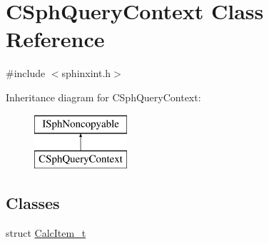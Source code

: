 \hypertarget{classCSphQueryContext}{\section{C\-Sph\-Query\-Context Class Reference}
\label{classCSphQueryContext}
}


{\ttfamily \#include $<$sphinxint.\-h$>$}

Inheritance diagram for C\-Sph\-Query\-Context\-:\begin{figure}[H]
\begin{center}
\leavevmode
\includegraphics[height=2.000000cm]{classCSphQueryContext}
\end{center}
\end{figure}
\subsection*{Classes}
\begin{DoxyCompactItemize}
\item 
struct \hyperlink{structCSphQueryContext_1_1CalcItem__t}{Calc\-Item\-\_\-t}
\end{DoxyCompactItemize}
